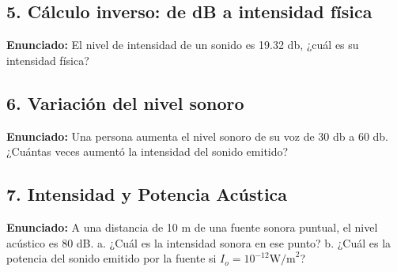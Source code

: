 \documentclass[12pt, letterpaper]{article}
\begin{document}
\subsection*{5. Cálculo inverso: de dB a intensidad física}
\noindent \textbf{Enunciado:} El nivel de intensidad de un sonido es 19.32 db, ¿cuál es su intensidad física?


\subsection*{6. Variación del nivel sonoro}
\noindent \textbf{Enunciado:} Una persona aumenta el nivel sonoro de su voz de 30 db a 60 db. ¿Cuántas veces aumentó la intensidad del sonido emitido?


\subsection*{7. Intensidad y Potencia Acústica}
\noindent \textbf{Enunciado:} A una distancia de 10 m de una fuente sonora puntual, el nivel acústico es 80 dB. a. ¿Cuál es la intensidad sonora en ese punto? b. ¿Cuál es la potencia del sonido emitido por la fuente si $I_o=10^{-12}\text{W/m}^2$?
\end{document}
